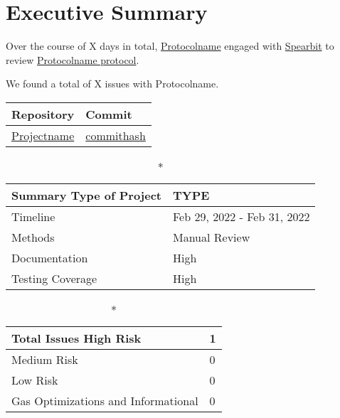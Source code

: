 \hypertarget{executive-summary}{%
\section{Executive Summary}\label{executive-summary}}

Over the course of X days in total, \href{https://protocolname.come}{Protocolname} engaged with
\href{https://spearbit.com}{Spearbit} to review
\href{https://github.com/permalink-to-protocolname}{Protocolname protocol}. 

We found a total of X issues with Protocolname. 

\begin{longtable}[c]{|l|l|}
\hline \textbf{Repository} & \textbf{Commit} \\

\hline
\href{https://github.com/permalink}{Projectname} &
\href{https://github.com/permalink/commit/commithash}{commithash} \\
\hline
\end{longtable}

\begin{longtable}[]{|l|l|}

\caption*{\textbf{Summary}}
\hline Type of Project & TYPE \\   
\hline Timeline & Feb 29, 2022 - Feb 31, 2022   \\
\hline Methods & Manual Review \\
\hline Documentation & High \\
\hline Testing Coverage & High  \\
\hline
\end{longtable}


\begin{longtable}[]{|l|l|}
\caption*{\textbf{Total Issues}}
\hline High Risk & 1 \\
\hline Medium Risk & 0 \\ 
\hline Low Risk & 0 \\
\hline Gas Optimizations and Informational & 0 \\
\hline
\end{longtable}

